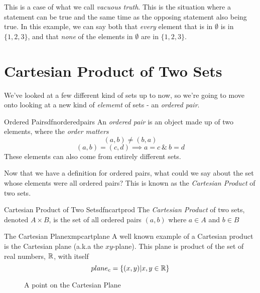 This is a case of what we call \emph{vacuous truth}. This is the situation where a statement can be true and the same time as the opposing statement also being true. In this example, we can say both that \emph{every} element that is in $\emptyset$ is in $\{1,2,3\}$, and that \emph{none} of the elements in $\emptyset$ are in $\{1,2,3\}$.

\section{Cartesian Product of Two Sets}
We've looked at a few different kind of sets up to now, so we're going to move onto looking at a new kind of \emph{elememt} of sets - an \emph{ordered pair}.

\begin{dfn}[label={def:orderedpairs}]{Ordered Pairs}{dfnorderedpairs}
    An \emph{ordered pair} is an object made up of two elements, where the \emph{order matters}
    $$(a,b) \neq (b,a)$$
    $$(a,b) = (c,d) \implies a = c\  \& \ b=d$$
    These elements can also come from entirely different sets.
\end{dfn}

Now that we have a definition for ordered pairs, what could we say about the set whose elements were all ordered pairs? This is known as the \emph{Cartesian Product} of two sets.

\begin{dfn}[label={def:cartprod}]{Cartesian Product of Two Sets}{dfncartprod}
    The \emph{Cartesian Product} of two sets, denoted $A \times B$, is the set of all ordered pairs $(a,b)$ where $a \in A$ and $b \in B$
\end{dfn}

\begin{exmpl}[label={exmpl: cartplane}]{The Cartesian Plane}{xmpcartplane}
    A well known example of a Cartesian product is the Cartesian plane (a.k.a the $xy$-plane). This plane is product of the set of real numbers, $\mathbb{R}$, with itself
    $$plane_c = \{(x,y) | x,y \in \mathbb{R}\}$$
\end{exmpl}

\newpage

\begin{figure}[ht]
    \label{fig:pointOnPlane}
    \begin{center}
    \end{center}
    \caption{A point on the Cartesian Plane}
\end{figure}

